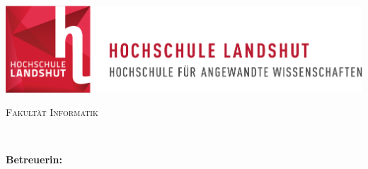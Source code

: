 
\thispagestyle{empty}

\begin{titlepage}

\vspace{3cm}

\begin{center}
	\includegraphics[scale=0.9]{0-Template/Logo.pdf}
\end{center}

\vspace{2cm}

\begin{center}
	\large \textsc{Fakultät Informatik}
\end{center}

\vspace{1cm}

\begin{center}
	\huge \thesis\
\end{center}

\begin{center}
	\huge \textbf{\textsc{\batitle}}
\end{center}

\vspace{1cm}

\begin{center}
	\large \vorname{} \name{}
\end{center}

\vspace{4cm}

\begin{center}
	\large
	\textbf{Betreuerin: }\babetreuer\
\end{center}

\end{titlepage}
